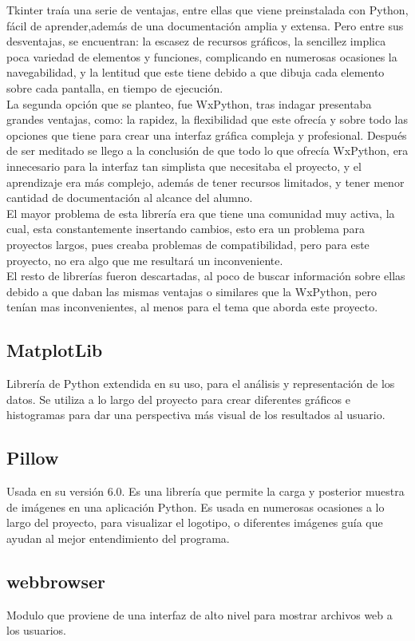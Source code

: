 Tkinter traía una serie de ventajas, entre ellas que viene preinstalada con Python, fácil de aprender,además de una documentación amplia y extensa. Pero entre sus desventajas, se encuentran: la escasez de recursos gráficos, la sencillez implica poca variedad de elementos y funciones, complicando en numerosas ocasiones la navegabilidad, y la lentitud que este tiene debido a que dibuja cada elemento sobre cada pantalla, en tiempo de ejecución.\\

La segunda opción que se planteo, fue WxPython, tras indagar presentaba  grandes ventajas, como: la rapidez,  la flexibilidad que este ofrecía y sobre todo  las opciones que tiene para crear una interfaz gráfica compleja y profesional. Después de ser meditado se llego a la conclusión de  que todo lo que  ofrecía WxPython, era innecesario para la interfaz tan simplista que necesitaba el proyecto, y el aprendizaje era más complejo, además de tener recursos limitados, y tener menor cantidad de documentación al alcance del alumno.\\
El mayor problema de esta librería era que tiene una comunidad muy activa, la cual, esta constantemente insertando cambios, esto era un problema para proyectos largos, pues creaba problemas de compatibilidad, pero para este proyecto, no era algo que me resultará un inconveniente.\\

El resto de librerías fueron descartadas, al poco de buscar información sobre ellas debido a que daban las mismas ventajas o similares que la WxPython, pero tenían mas inconvenientes, al menos para el tema que aborda este proyecto.
\subsection{MatplotLib}
Librería de Python extendida en su uso, para el análisis y representación de los datos. Se utiliza a lo largo del proyecto para crear diferentes gráficos e histogramas para dar una perspectiva más visual de los resultados al usuario.
\subsection{Pillow}
Usada en su versión 6.0. Es una librería que permite la carga y posterior muestra de imágenes en una aplicación Python. Es usada en numerosas ocasiones a lo largo del proyecto, para visualizar el logotipo, o diferentes imágenes guía que ayudan al mejor entendimiento del programa.
\subsection{webbrowser}
Modulo que proviene de una interfaz de alto nivel para mostrar archivos web a los usuarios.
